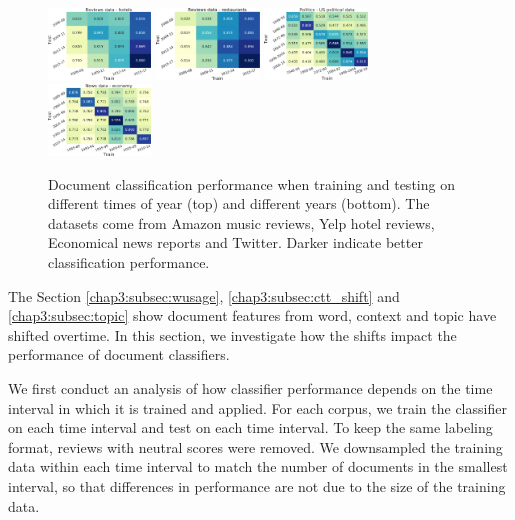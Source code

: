 \begin{figure}[tb!]
\includegraphics[width=0.244\textwidth]{images/chapter3/acl2018/year_hotel}
\includegraphics[width=0.244\textwidth]{images/chapter3/acl2018/year_rest}
\includegraphics[width=0.244\textwidth]{images/chapter3/acl2018/year_parties}
\includegraphics[width=0.244\textwidth]{images/chapter3/acl2018/year_economy}
\caption{\label{chap3:fig:time} Document classification performance when training and testing on different times of year (top) and different years (bottom). The datasets come from Amazon music reviews, Yelp hotel reviews, Economical news reports and Twitter. Darker indicate better classification performance.}
\end{figure}

The Section \ref{chap3:subsec:wusage}, \ref{chap3:subsec:ctt_shift} and \ref{chap3:subsec:topic} show document features from word, context and topic have shifted overtime. In this section, we investigate how the shifts impact the performance of document classifiers.

We first conduct an analysis of how classifier performance depends on the time interval in which it is trained and applied.
For each corpus, we train the classifier on each time interval and test on each time interval.
To keep the same labeling format, reviews with neutral scores were removed.
We downsampled the training data within each time interval to match the number of documents in the smallest interval, so that differences in performance are not due to the size of the training data.

